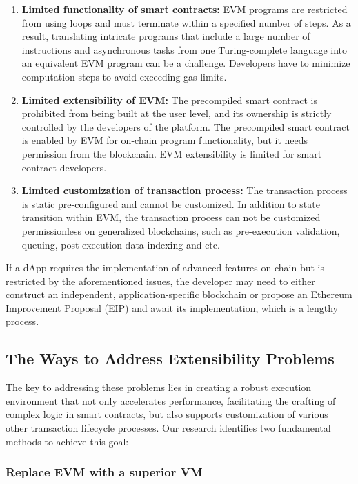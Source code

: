 \begin{enumerate}
    \item \textbf{Limited functionality of smart contracts:} EVM programs are restricted from using loops and must terminate within a specified number of steps. As a result, translating intricate programs that include a large number of instructions and asynchronous tasks from one Turing-complete language into an equivalent EVM program can be a challenge. Developers have to minimize computation steps to avoid exceeding gas limits.
    \item \textbf{Limited extensibility of EVM:} The precompiled smart contract is prohibited from being built at the user level, and its ownership is strictly controlled by the developers of the platform. The precompiled smart contract is enabled by EVM for on-chain program functionality, but it needs permission from the blockchain. EVM extensibility is limited for smart contract developers.
    \item \textbf{Limited customization of transaction process:} The transaction process is static pre-configured and cannot be customized. In addition to state transition within EVM, the transaction process can not be customized permissionless on generalized blockchains, such as pre-execution validation, queuing, post-execution data indexing and etc.
\end{enumerate}

If a dApp requires the implementation of advanced features on-chain but is restricted by the aforementioned issues, the developer may need to either construct an independent, application-specific blockchain or propose an Ethereum Improvement Proposal (EIP) and await its implementation, which is a lengthy process.

\subsection{The Ways to Address Extensibility Problems}

The key to addressing these problems lies in creating a robust execution environment that not only accelerates performance, facilitating the crafting of complex logic in smart contracts, but also supports customization of various other transaction lifecycle processes. Our research identifies two fundamental methods to achieve this goal:

\subsubsection{Replace EVM with a superior VM}

